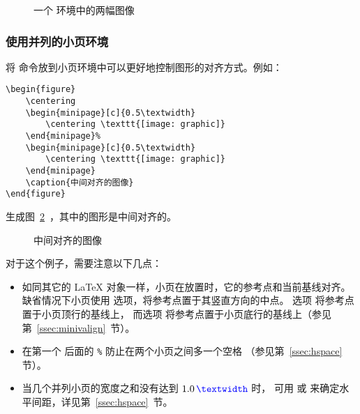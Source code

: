 \begin{figure} 
	\centering 
	\resizebox{1in}{!}{\usebox{\boxgraphic}}%
	\hspace{1in}%
	\resizebox{2in}{!}{\usebox{\boxgraphic}}
	\caption{一个  环境中的两幅图像}\label{fig:sidegraphics}
\end{figure}

\subsubsection{使用并列的小页环境}

将  命令放到小页环境中可以更好地控制图形的对齐方式。例如：
\begin{lstlisting}
\begin{figure} 
	\centering 
	\begin{minipage}[c]{0.5\textwidth} 
		\centering \texttt{[image: graphic]} 
	\end{minipage}% 
	\begin{minipage}[c]{0.5\textwidth} 
		\centering \texttt{[image: graphic]} 
	\end{minipage} 
	\caption{中间对齐的图像} 
\end{figure}
\end{lstlisting}
生成图~\ref{fig:minipagegraphics}~，其中的图形是中间对齐的。

\begin{figure} 
	\centering 
	\begin{minipage}[c]{0.5\textwidth} 
		\centering
		\resizebox{1in}{!}{\usebox{\boxgraphic}} 
	\end{minipage}%
	\begin{minipage}[c]{0.5\textwidth} 
		\centering
		\resizebox{2in}{!}{\usebox{\boxgraphic}} 
	\end{minipage} 
	\caption{中间对齐的图像} \label{fig:minipagegraphics}
\end{figure}

对于这个例子，需要注意以下几点：
\begin{itemize}
	\item 如同其它的 \LaTeX{} 对象一样，小页在放置时，它的参考点和当前基线对齐。
	缺省情况下小页使用 \opt{[c]} 选项，将参考点置于其竖直方向的中点。
	选项 \opt{[t]} 将参考点置于小页顶行的基线上，
	而选项 \opt{[b]} 将参考点置于小页底行的基线上（参见第~\ref{ssec:minivalign}~节）。
	
	\item 在第一个  后面的 \texttt{\%} 防止在两个小页之间多一个空格
	（参见第~\ref{ssec:hspace} 节）。
	
	\item 当几个并列小页的宽度之和没有达到 $1.0\,\text{\cmd{textwidth}}$ 时，
	可用  或  来确定水平间距，详见第~\ref{ssec:hspace}~节。
\end{itemize}


